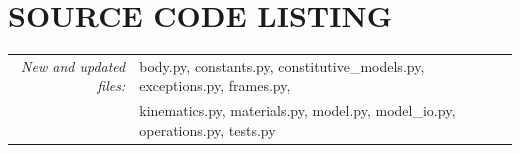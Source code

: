 \documentclass[]{spie}  %
\begin{document}
\section{SOURCE CODE LISTING}

\begin{tabular}{ r l }
\textit{New and updated files:} & body.py, constants.py, constitutive\_models.py, exceptions.py, frames.py, \\
					  & kinematics.py, materials.py, model.py, model\_io.py, operations.py, tests.py 
\end{tabular}
\end{document}
